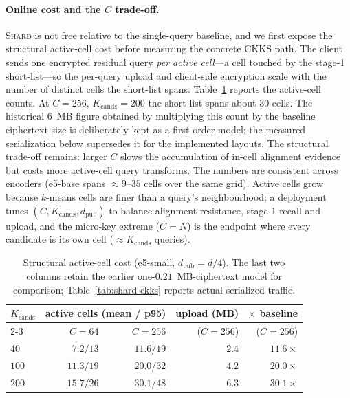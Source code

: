\documentclass[11pt,a4paper]{article}
\begin{document}
\paragraph{Online cost and the $C$ trade-off.}\label{ssec:shard-cost}

\textsc{Shard} is not free relative to the single-query baseline, and we
first expose the structural active-cell cost before measuring the concrete
CKKS path. The client sends one encrypted
residual query \emph{per active cell}---a cell touched by the stage-1
short-list---so the per-query upload and client-side encryption scale with
the number of distinct cells the short-list spans. Table~\ref{tab:shard-cost}
reports the active-cell counts. At $C{=}256$, $K_{\mathrm{cands}}{=}200$ the
short-list spans about $30$ cells. The historical $6$~MB figure obtained by
multiplying this count by the baseline ciphertext size is deliberately kept
as a first-order model; the measured serialization below supersedes it for
the implemented layouts. The structural trade-off remains: larger $C$ slows the accumulation
of in-cell alignment evidence but costs more active-cell query transforms. The
numbers are consistent across encoders (e5-base spans $\approx 9$--$35$
cells over the same grid). Active cells grow because $k$-means cells are
finer than a query's neighbourhood; a deployment tunes $(C,
K_{\mathrm{cands}}, d_{\mathrm{pub}})$ to balance alignment resistance,
stage-1 recall and upload, and the micro-key extreme ($C{=}N$) is the
endpoint where every candidate is its own cell ($\approx K_{\mathrm{cands}}$
queries).

\begin{table}[tbp]
\centering
\caption{Structural active-cell cost (e5-small, $d_{\mathrm{pub}}=d/4$).
The last two columns retain the earlier one-$0.21$~MB-ciphertext model for
comparison; Table~\ref{tab:shard-ckks} reports actual serialized traffic.}
\label{tab:shard-cost}
\small
\begin{tabular}{@{}lrrrr@{}}
\toprule
$K_{\mathrm{cands}}$ & \multicolumn{2}{c}{active cells (mean / p95)} & upload (MB) & $\times$ baseline\\
\cmidrule(lr){2-3}
 & $C{=}64$ & $C{=}256$ & ($C{=}256$) & ($C{=}256$)\\
\midrule
$40$  & $7.2 / 13$  & $11.6 / 19$ & $2.4$ & $11.6\times$\\
$100$ & $11.3 / 19$ & $20.0 / 32$ & $4.2$ & $20.0\times$\\
$200$ & $15.7 / 26$ & $30.1 / 48$ & $6.3$ & $30.1\times$\\
\bottomrule
\end{tabular}
\end{table}
\end{document}
